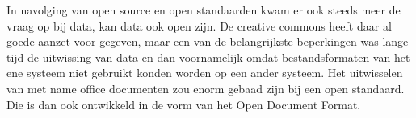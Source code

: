 In navolging van open source en open standaarden kwam er ook steeds meer de vraag op bij data, kan data ook open zijn.
De creative commons heeft daar al goede aanzet voor gegeven, maar een van de belangrijkste beperkingen was lange tijd
de uitwissing van data en dan voornamelijk omdat bestandsformaten van het ene systeem niet gebruikt konden worden op
een ander systeem. Het uitwisselen van met name office documenten zou enorm gebaad zijn bij een open standaard. Die is
dan ook ontwikkeld in de vorm van het Open Document Format.
